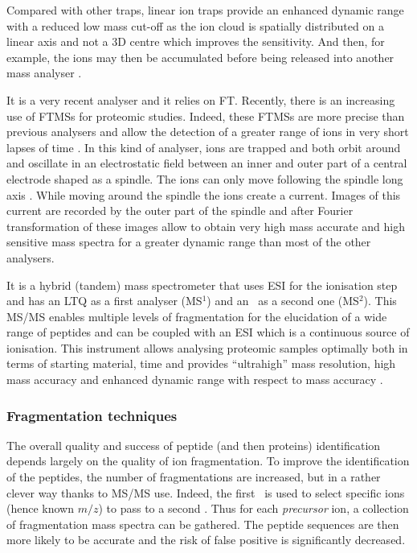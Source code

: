 Compared with other traps, linear ion traps provide an enhanced dynamic range
with a reduced low mass cut-off as the ion cloud is
spatially distributed on a linear axis and not a 3D centre which improves the
sensitivity. And then, for example, the ions may then be accumulated before
being released into another mass analyser .

\minisec{\orbi}
It is a very recent analyser and it relies on \gls{FT}. Recently,
there is an increasing use of \glspl{FTMS} for proteomic studies. Indeed, these
\glspl{FTMS} are more precise than previous analysers and allow the detection of
a greater range of ions in very short lapses of time .
In this kind of analyser, ions are trapped and both orbit around and oscillate
in an electrostatic field between an inner and outer part of a central electrode
shaped as a spindle. The ions can only move following the spindle long axis
. While moving around the spindle the ions create a current.
Images of this current are recorded by the outer part of the spindle and after
Fourier transformation of these images allow to obtain very high mass accurate
and high sensitive mass spectra for a greater dynamic range than most of the
other analysers. 

It is a hybrid (tandem) mass spectrometer that uses \gls{ESI} for the ionisation
step and has an \gls{LTQ} as a first analyser (MS$^1$)
and an \orbi\ as a second one (MS$^2$).
This \gls{MS/MS} enables multiple levels of
fragmentation for the elucidation of a wide range of peptides and can be coupled
with an \gls{ESI} which is a continuous source of ionisation. This instrument
allows analysing proteomic samples optimally both in terms of starting material,
time  and provides \enquote{ultrahigh} mass resolution,
high mass accuracy and enhanced dynamic range with respect to mass accuracy
.

\subsubsection{Fragmentation techniques }

The overall quality and success of peptide (and then proteins)
identification depends largely on the quality of ion fragmentation. To improve
the identification of the peptides, the number of fragmentations are increased,
but in a rather clever way thanks to \gls{MS/MS} use. Indeed, the first \ms\ is
used to select specific ions (hence known $m/z$) to pass to a second \ms.
Thus for each \emph{precursor} ion, a collection of fragmentation mass spectra
can be gathered. The peptide sequences are then more likely to be accurate and
the risk of false positive is significantly decreased.

